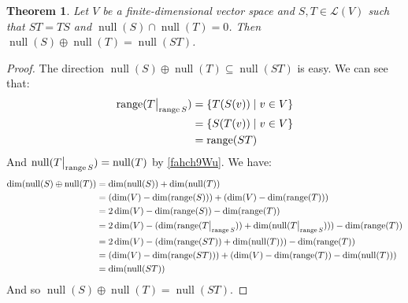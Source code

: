 \documentclass{article}
\DeclareMathOperator{\nullspace}{null}
\DeclareMathOperator{\range}{range}
\newcommand\restr[2]{{\left.\kern-\nulldelimiterspace #1 \vphantom{\big|} \right|_{#2}}}
\theoremstyle{plain}\newtheorem{theorem}{Theorem}
\theoremstyle{plain}\newtheorem{proposition}{Proposition}
\theoremstyle{remark}\newtheorem{remark}{Remark}
\begin{document}
\begin{theorem}\label{too2eiGo}
    Let $V$ be a finite-dimensional vector space and $S, T \in \mathcal{L}(V)$ such that $S T = T S$ and $\nullspace(S) \cap \nullspace(T) = 0$. Then $\nullspace(S) \oplus \nullspace(T) = \nullspace(S T)$.
\end{theorem}
\begin{proof}
    The direction $\nullspace(S) \oplus \nullspace(T) \subseteq \nullspace(S T)$ is easy. We can see that:
    \begin{equation*}
        \begin{aligned}
            \range(\restr{T}{\range{S}}) & = \{ T(S(v)) \mid v \in V \} \\
                                         & = \{ S(T(v)) \mid v \in V \} \\
                                         & = \range(S T)                \\
        \end{aligned}
    \end{equation*}
    And $\nullspace(\restr{T}{\range{S}}) = \nullspace(T)$ by \autoref{fahch9Wu}. We have:
    \begin{equation*}
        \begin{aligned}
            \dim(\nullspace(S) \oplus \nullspace(T))
             & = \dim(\nullspace(S)) + \dim(\nullspace(T))                                                                   \\
             & = (\dim(V) - \dim(\range(S))) + (\dim(V) - \dim(\range(T)))                                                   \\
             & = 2 \dim(V) - \dim(\range(S)) - \dim(\range(T))                                                               \\
             & = 2 \dim(V) - (\dim(\range(\restr{T}{\range{S}})) + \dim(\nullspace(\restr{T}{\range{S}}))) - \dim(\range(T)) \\
             & = 2 \dim(V) - (\dim(\range(S T)) + \dim(\nullspace(T))) - \dim(\range(T))                                     \\
             & = (\dim(V) - \dim(\range(S T))) + (\dim(V) - \dim(\range(T)) - \dim(\nullspace(T)))                           \\
             & = \dim(\nullspace(S T))                                                                                       \\
        \end{aligned}
    \end{equation*}
    And so $\nullspace(S) \oplus \nullspace(T) = \nullspace(S T)$.
\end{proof}
\end{document}
